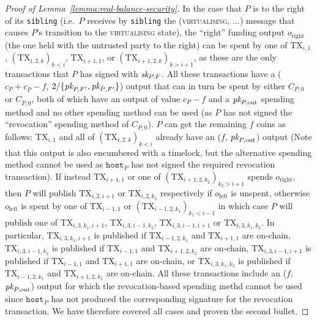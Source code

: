 \begin{proof}[Proof of Lemma~\ref{lemma:real-balance-security}]
  In the case that $P$ is to the right of its \texttt{sibling} (i.e.\ $P$
  receives by \texttt{sibling} the (\textsc{virtualising}, $\dots$) message that
  causes $P$'s transition to the \textsc{virtualising} state), the ``right''
  funding output $o_{\mathrm{right}}$ (the one held with the untrusted party to
  the right) can be spent by one of $\mathrm{TX}_{i, 1}$, $(\mathrm{TX}_{i, 2,
  k})_{k < i}$, $\mathrm{TX}_{i+1, 1}$, or $(\mathrm{TX}_{i+1, 2, k})_{k >
  i+1}$, as these are the only transactions that $P$ has signed with $\textit{sk}_{P,
  F}$. All these transactions have a ($c_P + c_{\bar{P}} - f$, $2/\{\textit{pk}_{P, F'},
  \textit{pk}_{\bar{P}, F'}\}$) output that can in turn be spent by either $C_{P, 0}$ or
  $C_{\bar{P}, 0}$, both of which have an output of value $c_P-f$ and a $\textit{pk}_{P,
  \mathrm{out}}$ spending method and no other spending method can be used (as
  $P$ has not signed the ``revocation'' spending method of $C_{P, 0}$). $P$ can
  get the remaining $f$ coins as follows: $\mathrm{TX}_{i, 1}$ and all of
  $(\mathrm{TX}_{i, 2, k})_{k < i}$ already have an ($f$, $\textit{pk}_{P,
  \mathrm{out}}$) output (Note that this output is also
  encumbered with a timelock, but the alternative spending method cannot be used
  as $\texttt{host}_P$ has not signed the required revocation transaction). If
  instead $\mathrm{TX}_{i+1, 1}$ or one of
  $(\mathrm{TX}_{i+1, 2, k_2})_{k_2 > i+1}$ spends $o_{\mathrm{right}}$, then
  $P$ will publish $\mathrm{TX}_{i, 2, i+1}$ or $\mathrm{TX}_{i, 2, k_2}$
  respectively if $o_{\mathrm{left}}$ is unspent, otherwise $o_{\mathrm{left}}$
  is spent by one of $\mathrm{TX}_{i-1, 1}$ or $(\mathrm{TX}_{i-1, 2, k_1})_{k_1
  < i-1}$ in which case $P$ will publish one of $\mathrm{TX}_{i, 3, k_1, i+1}$,
  $\mathrm{TX}_{i, 3, i-1, k_2}$, $\mathrm{TX}_{i, 3, i-1, i+1}$ or
  $\mathrm{TX}_{i, 3, k_1, k_2}$. In particular, $\mathrm{TX}_{i, 3, k_1, i+1}$
  is published if $\mathrm{TX}_{i-1, 2, k_1}$ and $\mathrm{TX}_{i+1, 1}$ are
  on-chain, $\mathrm{TX}_{i, 3, i-1, k_2}$ is published if $\mathrm{TX}_{i-1,
  1}$ and $\mathrm{TX}_{i+1, 2, k_2}$ are on-chain, $\mathrm{TX}_{i, 3, i-1,
  i+1}$ is published if $\mathrm{TX}_{i-1, 1}$ and $\mathrm{TX}_{i+1, 1}$ are
  on-chain, or $\mathrm{TX}_{i, 3, k_1, k_2}$ is published if $\mathrm{TX}_{i-1,
  2, k_1}$ and $\mathrm{TX}_{i+1, 2, k_2}$ are on-chain.  All these transactions
  include an ($f$, $\textit{pk}_{P, \mathrm{out}}$) output for which the revocation-based
  spending methd cannot be used since $\texttt{host}_P$ has not produced the
  corresponding signature for the revocation transaction. We have therefore
  covered all cases and proven the second bullet.


\end{proof}
